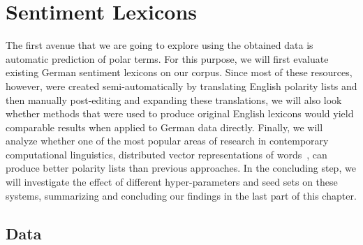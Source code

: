 

\chapter{Sentiment Lexicons}\label{chap:snt:lex}

The first avenue that we are going to explore using the obtained data
is automatic prediction of polar terms.
For this purpose, we will first evaluate existing German sentiment
lexicons on our corpus.  Since most of these resources, however, were
created semi-automatically by translating English polarity lists and
then manually post-editing and expanding these translations, we will
also look whether methods that were used to produce original English
lexicons would yield comparable results when applied to German data
directly.  Finally, we will analyze whether one of the most popular
areas of research in contemporary computational linguistics,
distributed vector representations of words~\cite{Mikolov:13}, can
produce better polarity lists than previous approaches.  In the
concluding step, we will investigate the effect of different
hyper-parameters and seed sets on these systems, summarizing and
concluding our findings in the last part of this chapter.

\section{Data}\label{sec:snt-lex:data}

